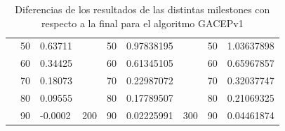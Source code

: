 \begin{table}[]
\begin{tabular}{|cclcclccl|}
\rowcolor[HTML]{DAE8FC} 
\multicolumn{1}{|c|}{\cellcolor[HTML]{FFFFC7}}                       & \multicolumn{1}{c|}{\cellcolor[HTML]{DAE8FC}50}        & \multicolumn{1}{l|}{\cellcolor[HTML]{DAE8FC}0.63711}    & \multicolumn{1}{c|}{\cellcolor[HTML]{FFFFC7}}                       & \multicolumn{1}{c|}{\cellcolor[HTML]{DAE8FC}50}        & \multicolumn{1}{l|}{\cellcolor[HTML]{DAE8FC}0.97838195} & \multicolumn{1}{c|}{\cellcolor[HTML]{FFFFC7}}                       & \multicolumn{1}{c|}{\cellcolor[HTML]{DAE8FC}50}        & 1.03637898 \\ \cline{2-3} \cline{5-6} \cline{8-9} 
\rowcolor[HTML]{DDFDFF} 
\multicolumn{1}{|c|}{\cellcolor[HTML]{FFFFC7}}                       & \multicolumn{1}{c|}{\cellcolor[HTML]{DDFDFF}60}        & \multicolumn{1}{l|}{\cellcolor[HTML]{DDFDFF}0.34425}    & \multicolumn{1}{c|}{\cellcolor[HTML]{FFFFC7}}                       & \multicolumn{1}{c|}{\cellcolor[HTML]{DDFDFF}60}        & \multicolumn{1}{l|}{\cellcolor[HTML]{DDFDFF}0.61345105} & \multicolumn{1}{c|}{\cellcolor[HTML]{FFFFC7}}                       & \multicolumn{1}{c|}{\cellcolor[HTML]{DDFDFF}60}        & 0.65967857 \\ \cline{2-3} \cline{5-6} \cline{8-9} 
\rowcolor[HTML]{DAE8FC} 
\multicolumn{1}{|c|}{\cellcolor[HTML]{FFFFC7}}                       & \multicolumn{1}{c|}{\cellcolor[HTML]{DAE8FC}70}        & \multicolumn{1}{l|}{\cellcolor[HTML]{DAE8FC}0.18073}    & \multicolumn{1}{c|}{\cellcolor[HTML]{FFFFC7}}                       & \multicolumn{1}{c|}{\cellcolor[HTML]{DAE8FC}70}        & \multicolumn{1}{l|}{\cellcolor[HTML]{DAE8FC}0.22987072} & \multicolumn{1}{c|}{\cellcolor[HTML]{FFFFC7}}                       & \multicolumn{1}{c|}{\cellcolor[HTML]{DAE8FC}70}        & 0.32037747 \\ \cline{2-3} \cline{5-6} \cline{8-9} 
\rowcolor[HTML]{DDFDFF} 
\multicolumn{1}{|c|}{\cellcolor[HTML]{FFFFC7}}                       & \multicolumn{1}{c|}{\cellcolor[HTML]{DDFDFF}80}        & \multicolumn{1}{l|}{\cellcolor[HTML]{DDFDFF}0.09555}    & \multicolumn{1}{c|}{\cellcolor[HTML]{FFFFC7}}                       & \multicolumn{1}{c|}{\cellcolor[HTML]{DDFDFF}80}        & \multicolumn{1}{l|}{\cellcolor[HTML]{DDFDFF}0.17789507} & \multicolumn{1}{c|}{\cellcolor[HTML]{FFFFC7}}                       & \multicolumn{1}{c|}{\cellcolor[HTML]{DDFDFF}80}        & 0.21069325 \\ \cline{2-3} \cline{5-6} \cline{8-9} 
\rowcolor[HTML]{DAE8FC} 
\multicolumn{1}{|c|}{\multirow{-13}{*}{\cellcolor[HTML]{FFFFC7}100}} & \multicolumn{1}{c|}{\cellcolor[HTML]{DAE8FC}90}        & \multicolumn{1}{l|}{\cellcolor[HTML]{DAE8FC}-0.0002}    & \multicolumn{1}{c|}{\multirow{-13}{*}{\cellcolor[HTML]{FFFFC7}200}} & \multicolumn{1}{c|}{\cellcolor[HTML]{DAE8FC}90}        & \multicolumn{1}{l|}{\cellcolor[HTML]{DAE8FC}0.02225991} & \multicolumn{1}{c|}{\multirow{-13}{*}{\cellcolor[HTML]{FFFFC7}300}} & \multicolumn{1}{c|}{\cellcolor[HTML]{DAE8FC}90}        & 0.04461874 \\ \hline
\end{tabular}
\caption{\label{DiferenciasGACEPv1}Diferencias de los resultados de las distintas milestones con respecto a la final para el algoritmo GACEPv1}
\end{table}

